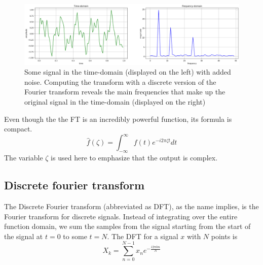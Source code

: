 \begin{figure}[ht]
    \centering
    \includegraphics[width=\textwidth]{./images/transform.png}
    \caption{Some signal in the time-domain (displayed on the left) with added noise. Computing the transform with a discrete version of the Fourier transform reveals the main frequencies that make up the original signal in the time-domain (displayed on the right)\label{fig:transform}}
\end{figure}

Even though the the FT is an incredibly powerful function, its formula is compact. 
$$\hat{f}(\zeta) = \int_{-\infty}^{\infty} f(t)e^{-i2\pi\zeta t} dt$$
The variable $\zeta$ is used here to emphasize that the output is complex.


\subsection{Discrete fourier transform} 
The Discrete Fourier transform (abbreviated as DFT), as the name implies, is the Fourier transform for discrete signals. Instead of integrating over the entire function domain, we sum the samples from the signal starting from the start of the signal at $t=0$ to some $t=N$. The DFT for a signal $x$ with $N$ points is 
$$X_k = \sum_{n=0}^{N-1} x_ne^{-\frac{i2\pi kn}{N}}$$

